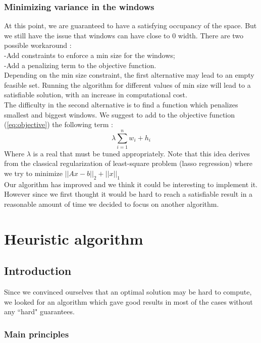 \documentclass{acmtog}
\begin{document}
\subsubsection{Minimizing variance in the windows}
At this point, we are guaranteed to have a satisfying occupancy of the space. But we still have the issue that windows can have close to 0 width. There are two possible workaround : \\
-Add constraints to enforce a min size for the windows; \\
-Add a penalizing term to the objective function. \\
Depending on the min size constraint, the first alternative  may lead to an empty feasible set. Running the algorithm for different values of min size will lead to a satisfiable solution, with an increase in computational cost. \\
The difficulty in the second alternative is to find a function which penalizes smallest and biggest windows. We suggest to add to the objective function (\ref{eq:objective}) the following term :
\begin{equation}
\lambda \sum_{i = 1}^{n}{w_i + h_i}
\end{equation}
 Where $\lambda$ is a real that must be tuned appropriately. Note that this idea derives from the classical regularization of least-square problem (lasso regression) where we try to minimize $||Ax - b||_2 + ||x||_1$\\
Our algorithm has improved and we think it could be interesting to implement it. However since we first thought it would be hard to reach a satisfiable result in a reasonable amount of time we decided to focus on another algorithm.


\section{Heuristic algorithm}

\subsection{Introduction}

Since we convinced ourselves that an optimal solution may be hard to compute, we looked for an algorithm which gave good results in most of the cases without any ``hard" guarantees.

\subsubsection{Main principles}
\end{document}
